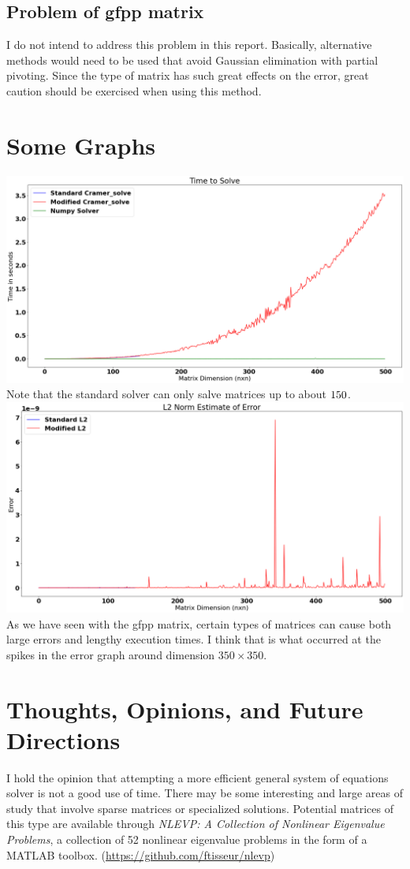 \documentclass[12pt]{article}
\begin{document}
\subsection{Problem of gfpp matrix}
I do not intend to address this problem in this report. Basically, alternative methods would need to be used that avoid Gaussian elimination with partial pivoting. Since the type of matrix has such great effects on the error, great caution should be exercised when using this method.

\section{Some Graphs}
\includegraphics[width=0.8\linewidth]{timer}
\\Note that the standard solver can only salve matrices up to about $150\time 150$.\\
\includegraphics[width=0.8\linewidth]{error}
\\
As we have seen with the gfpp matrix, certain types of matrices can cause both large errors and lengthy execution times. I think that is what occurred at the spikes in the error graph around dimension $350\times 350$.

\section{Thoughts, Opinions, and Future Directions}
I hold the opinion that attempting a more efficient general system of equations solver is not a good use of time. There may be some interesting and large areas of study that involve sparse matrices or specialized solutions. Potential matrices of this type are available through \textit{NLEVP: A Collection of Nonlinear Eigenvalue Problems}, a collection of 52 nonlinear eigenvalue problems in the form of a MATLAB toolbox. (\url{https://github.com/ftisseur/nlevp})
\end{document}
